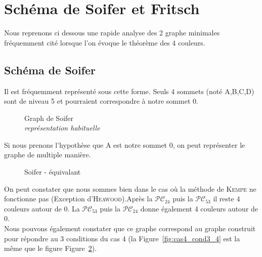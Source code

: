 \section{Schéma de Soifer et Fritsch}
Nous reprenons ci dessous une rapide analyse des 2 graphe minimales fréquemment cité lorsque l'on évoque le théorème des 4 couleurs.
\subsection{Schéma de Soifer}
Il est fréquemment représenté sous cette forme.
Seuls 4 sommets (noté A,B,C,D) sont de niveau 5 et pourraient correspondre à notre sommet 0.

\begin{figure}[!ht]\centering
		
	\caption{Graph de Soifer\\\footnotesize\textit{représentation habituelle}}\label{fig:soifer}
\end{figure}

Si nous prenons l’hypothèse que A est notre sommet 0, on peut représenter le graphe de multiple manière.
\begin{figure}[!h]\centering
	\begin{changemargin}{-3cm}{-3cm}
		\begin{center}
			
			\hspace{15pt}
			
			\hspace{15pt}
			
		\end{center}
	\end{changemargin}
\end{figure}
\begin{figure}[!h]\centering
	\begin{changemargin}{-3cm}{-3cm}
		\begin{center}
			
			\hspace{15pt}
			
			\hspace{15pt}
			
		\end{center}
	\end{changemargin}
	\begin{changemargin}{1.75cm}{1.75cm}
		\caption{Soifer - équivalant}\label{fig:Soifer_anamorphose}
	\end{changemargin}
\end{figure}
\FloatBarrier

On peut constater que nous sommes bien dans le cas où la méthode de \textsc{Kempe} ne fonctionne pas (Exception d'\textsc{Heawood}).Après la $\mathcal{PC}_{24}$ puis la $\mathcal{PC}_{53}$ il reste 4 couleurs autour de 0.
La $\mathcal{PC}_{53}$ puis la $\mathcal{PC}_{24}$ donne également 4 couleurs autour de 0.\\
Nous pouvons également constater que ce graphe correspond au graphe construit pour répondre au 3 conditions du cas 4 (la  Figure~\ref{fig:cas4_cond3_4} est la même que le figure Figure~\ref{fig:Soifer_anamorphose}). 
\\
